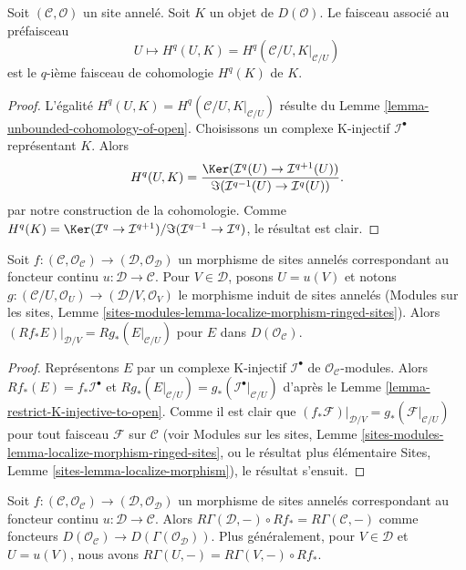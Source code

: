 \begin{lemma}
\label{lemma-sheafification-cohomology}
Soit $(\mathcal{C}, \mathcal{O})$ un site annelé. Soit $K$ un objet de
$D(\mathcal{O})$. Le faisceau associé au préfaisceau
$$
U \mapsto H^q(U, K) = H^q(\mathcal{C}/U, K|_{\mathcal{C}/U})
$$
est le $q$-ième faisceau de cohomologie $H^q(K)$ de $K$.
\end{lemma}

\begin{proof}
L'égalité $H^q(U, K) = H^q(\mathcal{C}/U, K|_{\mathcal{C}/U})$ résulte du
Lemme \ref{lemma-unbounded-cohomology-of-open}. Choisissons un complexe
K-injectif $\mathcal{I}^\bullet$ représentant $K$. Alors
$$
H^q(U, K) =
\frac{\Ker(\mathcal{I}^q(U) \to \mathcal{I}^{q + 1}(U))}
{\Im(\mathcal{I}^{q - 1}(U) \to \mathcal{I}^q(U))}.
$$
par notre construction de la cohomologie. Comme
$H^q(K) = \Ker(\mathcal{I}^q \to \mathcal{I}^{q + 1})/
\Im(\mathcal{I}^{q - 1} \to \mathcal{I}^q)$, le résultat est clair.
\end{proof}

\begin{lemma}
\label{lemma-restrict-direct-image-open}
Soit $f : (\mathcal{C}, \mathcal{O}_\mathcal{C}) \to
(\mathcal{D}, \mathcal{O}_\mathcal{D})$ un morphisme de sites annelés
correspondant au foncteur continu $u : \mathcal{D} \to \mathcal{C}$.
Pour $V \in \mathcal{D}$, posons $U = u(V)$ et notons
$g : (\mathcal{C}/U, \mathcal{O}_U) \to (\mathcal{D}/V, \mathcal{O}_V)$
le morphisme induit de sites annelés (Modules sur les sites, Lemme
\ref{sites-modules-lemma-localize-morphism-ringed-sites}).
Alors $(Rf_*E)|_{\mathcal{D}/V} = Rg_*(E|_{\mathcal{C}/U})$ pour $E$ dans
$D(\mathcal{O}_\mathcal{C})$.
\end{lemma}

\begin{proof}
Représentons $E$ par un complexe K-injectif $\mathcal{I}^\bullet$ de
$\mathcal{O}_\mathcal{C}$-modules. Alors
$Rf_*(E) = f_*\mathcal{I}^\bullet$
et $Rg_*(E|_{\mathcal{C}/U}) = g_*(\mathcal{I}^\bullet|_{\mathcal{C}/U})$
d'après le Lemme \ref{lemma-restrict-K-injective-to-open}. Comme il est
clair que
$(f_*\mathcal{F})|_{\mathcal{D}/V} = g_*(\mathcal{F}|_{\mathcal{C}/U})$
pour tout faisceau $\mathcal{F}$ sur $\mathcal{C}$ (voir Modules sur les
sites, Lemme \ref{sites-modules-lemma-localize-morphism-ringed-sites}, ou
le résultat plus élémentaire Sites, Lemme
\ref{sites-lemma-localize-morphism}), le résultat s'ensuit.
\end{proof}

\begin{lemma}
\label{lemma-Leray-unbounded}
Soit $f : (\mathcal{C}, \mathcal{O}_\mathcal{C}) \to
(\mathcal{D}, \mathcal{O}_\mathcal{D})$ un morphisme de sites annelés
correspondant au foncteur continu $u : \mathcal{D} \to \mathcal{C}$.
Alors $R\Gamma(\mathcal{D}, -) \circ Rf_* = R\Gamma(\mathcal{C}, -)$ comme
foncteurs $D(\mathcal{O}_\mathcal{C}) \to D(\Gamma(\mathcal{O}_\mathcal{D}))$.
Plus généralement, pour $V \in \mathcal{D}$ et $U = u(V)$, nous avons
$R\Gamma(U, -) = R\Gamma(V, -) \circ Rf_*$.
\end{lemma}

